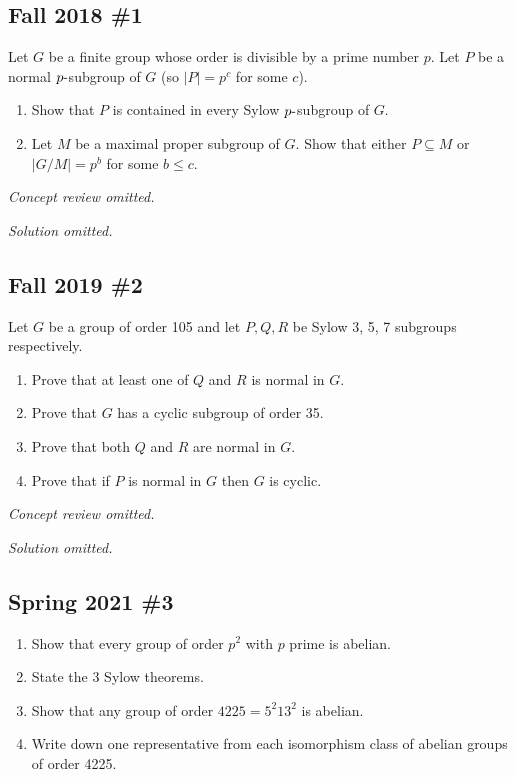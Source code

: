 \hypertarget{fall-2018-1}{%
\subsection{Fall 2018 \#1}\label{fall-2018-1}}

Let \(G\) be a finite group whose order is divisible by a prime number
\(p\). Let \(P\) be a normal \(p{\hbox{-}}\)subgroup of \(G\) (so
\({\left\lvert {P} \right\rvert} = p^c\) for some \(c\)).

\begin{enumerate}
\def\labelenumi{\alph{enumi}.}
\item
  Show that \(P\) is contained in every Sylow \(p{\hbox{-}}\)subgroup of
  \(G\).
\item
  Let \(M\) be a maximal proper subgroup of \(G\). Show that either
  \(P \subseteq M\) or \(|G/M | = p^b\) for some \(b \leq c\).
\end{enumerate}

\emph{Concept review omitted.}

\emph{Solution omitted.}

\hypertarget{fall-2019-2}{%
\subsection{Fall 2019 \#2}\label{fall-2019-2}}

Let \(G\) be a group of order 105 and let \(P, Q, R\) be Sylow 3, 5, 7
subgroups respectively.

\begin{enumerate}
\def\labelenumi{\alph{enumi}.}
\item
  Prove that at least one of \(Q\) and \(R\) is normal in \(G\).
\item
  Prove that \(G\) has a cyclic subgroup of order 35.
\item
  Prove that both \(Q\) and \(R\) are normal in \(G\).
\item
  Prove that if \(P\) is normal in \(G\) then \(G\) is cyclic.
\end{enumerate}

\emph{Concept review omitted.}

\emph{Solution omitted.}

\hypertarget{spring-2021-3}{%
\subsection{Spring 2021 \#3}\label{spring-2021-3}}

\begin{enumerate}
\def\labelenumi{\alph{enumi}.}
\item
  Show that every group of order \(p^2\) with \(p\) prime is abelian.
\item
  State the 3 Sylow theorems.
\item
  Show that any group of order \(4225 = 5^2 13^2\) is abelian.
\item
  Write down one representative from each isomorphism class of abelian
  groups of order 4225.
\end{enumerate}

